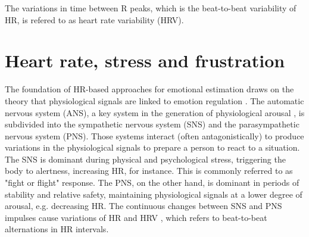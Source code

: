 The variations in time between R peaks, which is the beat-to-beat variability of HR, is refered to as heart rate variability (HRV).


%
%
%

\section{Heart rate, stress and frustration}

The foundation of HR-based approaches for emotional estimation draws on the theory that physiological signals are linked to emotion regulation \parencite{appelhans2006heart,fenton2012emotion,schubert2009effects}. The automatic nervous system (ANS), a key system in the generation of physiological arousal \parencite{appelhans2006heart}, is subdivided into the sympathetic nervous system (SNS) and the parasympathetic nervous system (PNS). Those systems interact (often antagonistically) to produce variations in the physiological signals to prepare a person to react to a situation. The SNS is dominant during physical and psychological stress, triggering the body to alertness, increasing HR, for instance. This is commonly referred to as "fight or flight" response. The PNS, on the other hand, is dominant in periods of stability and relative safety, maintaining physiological signals at a lower degree of arousal, e.g. decreasing HR. The continuous changes between SNS and PNS impulses cause variations of HR and HRV \parencite{schubert2009effects}, which refers to beat-to-beat alternations in HR intervals.


